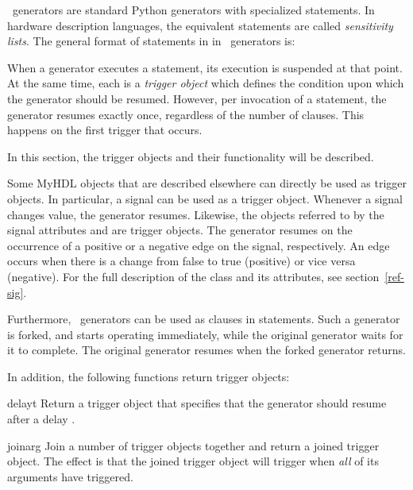 \myhdl\ generators are standard Python generators with specialized
 statements. In hardware description languages, the equivalent
statements are called 
\emph{sensitivity lists}. The general format
of  statements in in \myhdl\ generators is:

\hspace{\leftmargin} 

When a generator executes a  statement, its
execution is suspended at that point. At the same time, each
 is a \emph{trigger object} which defines the condition
upon which the generator should be resumed. However, per invocation of a
 statement, the generator resumes exactly once,
regardless of the number of clauses. This happens on the
first trigger that occurs.

In this section, the trigger objects and their functionality will be
described.

Some MyHDL objects that are described elsewhere can directly be used
as trigger objects. In particular, a signal can be used as
a trigger object. Whenever a signal changes value, the generator
resumes. Likewise, the objects referred to by the signal attributes
 and  are trigger objects. The generator
resumes on the occurrence of a positive or a negative edge on the
signal, respectively. An edge occurs when there is a change from
false to true (positive) or vice versa (negative).
For the full description of the  class and its
attributes, see section~\ref{ref-sig}.

Furthermore, \myhdl\ generators can be used as clauses in 
statements. Such a generator is forked, and starts operating
immediately, while the original generator
waits for it to complete. The original generator resumes when the
forked generator returns.


In addition, the following functions return trigger objects:

\begin{funcdesc}{delay}{t}
Return a trigger object that specifies that the generator should
resume after a delay .
\end{funcdesc}

\begin{funcdesc}{join}{arg }
Join a number of trigger objects together and return a joined
trigger object.  The effect is that the joined trigger object will
trigger when \emph{all} of its arguments have triggered.
\end{funcdesc}


